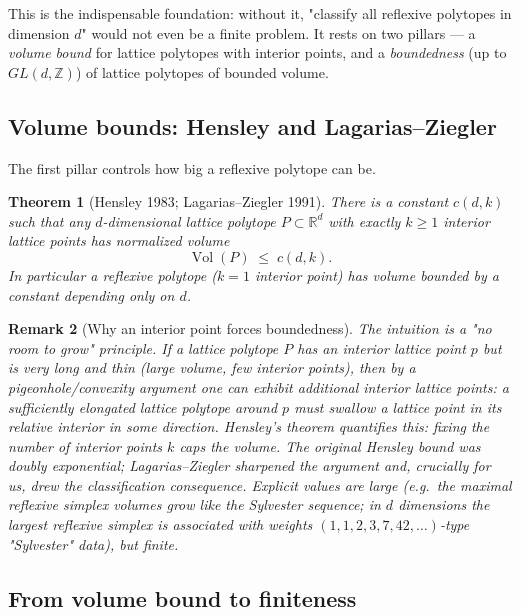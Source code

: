 \documentclass{amsart}
\newtheorem{theorem}{Theorem}[section]
\newtheorem{remark}[theorem]{Remark}
\begin{document}
This is the indispensable foundation: without it, "classify all reflexive
polytopes in dimension $d$" would not even be a finite problem. It rests on
two pillars --- a \emph{volume bound} for lattice polytopes with interior
points, and a \emph{boundedness} (up to $GL(d,\mathbb{Z})$) of lattice
polytopes of bounded volume.

\subsection{Volume bounds: Hensley and Lagarias--Ziegler}

The first pillar controls how big a reflexive polytope can be.

\begin{theorem}[Hensley 1983; Lagarias--Ziegler 1991]\label{thm:hensley}
There is a constant $c(d,k)$ such that any $d$-dimensional lattice polytope
$P \subset \mathbb{R}^d$ with exactly $k \geq 1$ interior lattice points has
normalized volume
\begin{equation}
  \operatorname{Vol}(P) \;\leq\; c(d,k).
\end{equation}
In particular a reflexive polytope ($k=1$ interior point) has volume bounded
by a constant depending only on $d$.
\end{theorem}

\begin{remark}[Why an interior point forces boundedness]
The intuition is a "no room to grow" principle. If a lattice polytope $P$
has an interior lattice point $p$ but is very long and thin (large volume,
few interior points), then by a pigeonhole/convexity argument one can
exhibit \emph{additional} interior lattice points: a sufficiently elongated
lattice polytope around $p$ must swallow a lattice point in its relative
interior in some direction. Hensley's theorem quantifies this: fixing the
number of interior points $k$ caps the volume. The original Hensley bound was
doubly exponential; Lagarias--Ziegler sharpened the argument and, crucially
for us, drew the classification consequence. Explicit values are large
(e.g.\ the maximal reflexive simplex volumes grow like the Sylvester
sequence; in $d$ dimensions the largest reflexive simplex is associated with
weights $(1,1,2,3,7,42,\dots)$-type "Sylvester" data), but \emph{finite}.
\end{remark}

\subsection{From volume bound to finiteness}
\end{document}
